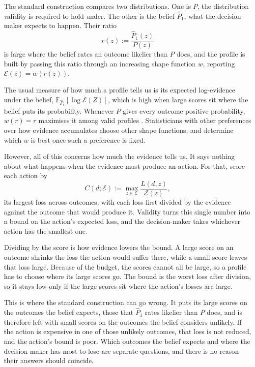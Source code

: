 The standard construction compares two distributions. One is $P$, the
distribution validity is required to hold under. The other is the belief $\widehat P_1$,
what the decision-maker expects to happen. Their ratio
\begin{equation}
  r(z):=\frac{\widehat P_1(z)}{P(z)}
  \label{eq:intro_lr}
\end{equation}
is large where the belief rates an outcome likelier than $P$ does, and the profile is built by passing this ratio through an increasing
shape function $w$, reporting $\mathcal E(z)=w(r(z))$. 

The usual measure of how much a profile tells us is its expected
log-evidence under the belief, $\mathbb E_{\widehat P_1}[\log\mathcal E(Z)]$,
which is high when large scores sit where the belief puts its probability.
Whenever $P$ gives every outcome positive probability, $w(r)=r$ maximises it
among valid profiles \citep{Grunwald2024safe,Koning2025continuous}. Statisticians with other preferences over how evidence accumulates choose
other shape functions, and \citet{KoningvanMeer2025} determine which $w$ is
best once such a preference is fixed.

However, all of this concerns how much the evidence tells us. It says nothing about
what happens when the evidence must produce an action. For that,
\citet{KoningvanMeer2025} score each action by
\begin{equation}
  C(d;\mathcal E):=\max_{z\in\mathcal Z}\frac{L(d,z)}{\mathcal E(z)} ,
  \label{eq:intro_cert}
\end{equation}
its largest loss across outcomes, with each loss first divided by the evidence
against the outcome that would produce it. Validity turns this single number
into a bound on the action's expected loss, and the decision-maker takes
whichever action has the smallest one.

Dividing by the score is how evidence lowers the bound. A large score on an
outcome shrinks the loss the action would suffer there, while a small score
leaves that loss large. Because of the budget, the scores cannot all be large,
so a profile has to choose where its large scores go.
The bound is the worst loss after division, so it stays low only if the large
scores sit where the action's losses are large.

This is where the standard construction can go wrong. It puts its large
scores on the outcomes the belief expects, those that $\widehat P_1$ rates
likelier than $P$ does, and is therefore left with small scores on the
outcomes the belief considers unlikely. If the action is expensive in
one of those unlikely outcomes, that loss is not reduced, and the action's
bound is poor. Which outcomes the belief expects and where the
decision-maker has most to lose are separate questions, and there is no
reason their answers should coincide.

